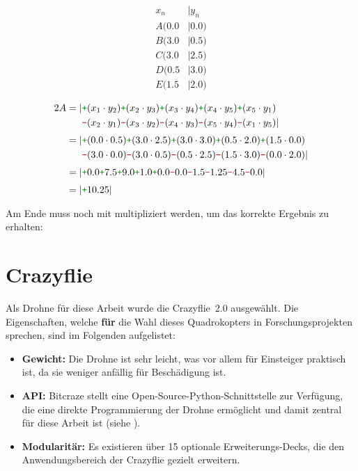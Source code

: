 \begin{minipage}[t]{0.2\textwidth}
    \begin{align*}
        x_n &| y_n \\[3pt]
        A(0.0 &| 0.0) \\
        B(3.0 &| 0.5) \\
        C(3.0 &| 2.5) \\
        D(0.5 &| 3.0) \\
        E(1.5 &| 2.0)
    \end{align*}
\end{minipage}
\vline
\begin{minipage}[t]{0.7\textwidth}
    \begin{align*}
        2A = |&\cp (x_1 \cdot y_2) \cp (x_2 \cdot y_3) \cp (x_3 \cdot y_4) \cp (x_4 \cdot y_5) \cp (x_5 \cdot y_1) \\
        &\cm (x_2 \cdot y_1) \cm (x_3 \cdot y_2) \cm (x_4 \cdot y_3) \cm (x_5 \cdot y_4) \cm (x_1 \cdot y_5)| \\[3pt]
        = |&\cp (0.0 \cdot 0.5) \cp (3.0 \cdot 2.5) \cp (3.0 \cdot 3.0) \cp (0.5 \cdot 2.0) \cp (1.5 \cdot 0.0) \\
        &\cm (3.0 \cdot 0.0) \cm (3.0 \cdot 0.5) \cm (0.5 \cdot 2.5) \cm (1.5 \cdot 3.0) \cm (0.0 \cdot 2.0)| \\[3pt]
        = |&\cp 0.0 \cp 7.5 \cp 9.0 \cp 1.0 \cp 0.0 \cm 0.0 \cm 1.5 \cm 1.25 \cm 4.5 \cm 0.0| \\[3pt]
        = |&\cp 10.25|
    \end{align*}
\end{minipage}

Am Ende muss noch mit  multipliziert werden, um das korrekte Ergebnis zu erhalten: 

\section{Crazyflie}
Als Drohne für diese Arbeit wurde die Crazyflie~2.0 ausgewählt.
Die Eigenschaften, welche \textbf{für} die Wahl dieses Quadrokopters in Forschungsprojekten sprechen, sind im Folgenden aufgelistet:

\begin{itemize}
    \item \textbf{Gewicht:} Die Drohne ist sehr leicht, was vor allem für Einsteiger praktisch ist, da sie weniger anfällig für Beschädigung ist.
    \item \textbf{API:} Bitcraze stellt eine Open-Source-Python-Schnittstelle zur Verfügung, die eine direkte Programmierung der Drohne ermöglicht und damit zentral für diese Arbeit ist (siehe ).
    \item \textbf{Modularitär:} Es existieren über 15 optionale Erweiterungs-Decks, die den Anwendungsbereich der Crazyflie gezielt erweitern.
\end{itemize}


